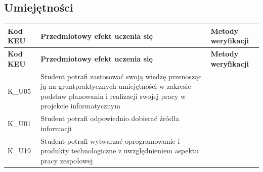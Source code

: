 \documentclass[12pt, a4paper]{article}
\newcommand{\thdrule}{\noalign{\global\setlength{\extrarowheight}{0pt}}}
\newcommand{\thdend}{\noalign{\global\setlength{\extrarowheight}{3pt}}}
\begin{document}
\subsection*{Umiejętności}
{\scriptsize
\begin{longtable}{m{1.6cm}m{9.0cm}m{4.2cm}}
\thdrule\toprule
\rowcolor{pjatkRed} {\color{white}\footnotesize\textbf{\vphantom{Ag}Kod KEU}} & {\color{white}\footnotesize\textbf{\vphantom{Ag}Przedmiotowy efekt uczenia się}} & {\color{white}\footnotesize\textbf{\vphantom{Ag}Metody weryfikacji}} \\
\midrule\thdend
\endfirsthead
\thdrule\toprule
\rowcolor{pjatkRed} {\color{white}\footnotesize\textbf{\vphantom{Ag}Kod KEU}} & {\color{white}\footnotesize\textbf{\vphantom{Ag}Przedmiotowy efekt uczenia się}} & {\color{white}\footnotesize\textbf{\vphantom{Ag}Metody weryfikacji}} \\
\midrule\thdend
\endhead
  \rowcolor{tableRowLight} K\_U05 & Student potrafi zastosować swoją wiedzę przenosząc ją na gruntpraktycznych umiejętności w zakresie podstaw planowania i realizacji swojej pracy w projekcie informatycznym &  \\
  \rowcolor{tableRowAlt} K\_U01 & Student potrafi odpowiednio dobierać źródła informacji &  \\
  \rowcolor{tableRowLight} K\_U19 & Student potrafi wytwarzać oprogramowanie i produkty technologiczne z uwzględnieniem aspektu pracy zespołowej &  \\
\bottomrule
\end{longtable}}
\end{document}
